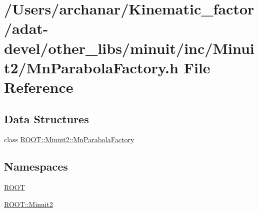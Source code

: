 \hypertarget{adat-devel_2other__libs_2minuit_2inc_2Minuit2_2MnParabolaFactory_8h}{}\section{/\+Users/archanar/\+Kinematic\+\_\+factor/adat-\/devel/other\+\_\+libs/minuit/inc/\+Minuit2/\+Mn\+Parabola\+Factory.h File Reference}
\label{adat-devel_2other__libs_2minuit_2inc_2Minuit2_2MnParabolaFactory_8h}
\subsection*{Data Structures}
\begin{DoxyCompactItemize}
\item 
class \mbox{\hyperlink{classROOT_1_1Minuit2_1_1MnParabolaFactory}{R\+O\+O\+T\+::\+Minuit2\+::\+Mn\+Parabola\+Factory}}
\end{DoxyCompactItemize}
\subsection*{Namespaces}
\begin{DoxyCompactItemize}
\item 
 \mbox{\hyperlink{namespaceROOT}{R\+O\+OT}}
\item 
 \mbox{\hyperlink{namespaceROOT_1_1Minuit2}{R\+O\+O\+T\+::\+Minuit2}}
\end{DoxyCompactItemize}
